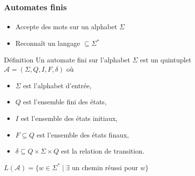 \frametitle{Automates finis}
\framesubtitle{}

\begin{itemize}
	\item Accepte des mots sur un alphabet $\Sigma$
	\item Reconnaît un langage $\subseteq \Sigma^*$
\end{itemize}

\begin{block}{Définition}
	Un automate fini sur l'alphabet $\Sigma$ est un quintuplet $\mathscr{A} = (\Sigma,Q,I,F,\delta)$ où
	
	\begin{itemize}
		\item $\Sigma$ est l'alphabet d'entrée,
		\item $Q$ est l'ensemble fini des états,
		\item $I$ est l'ensemble des états initiaux,
		\item $F \subseteq Q$ est l'ensemble des états finaux,
		\item $\delta \subseteq Q \times \Sigma \times Q$ est la relation de transition.
	\end{itemize}
\end{block}

\centering
$L(\mathscr{A}) = \{w \in \Sigma^* \mid \exists$ un chemin réussi pour $w \}$
